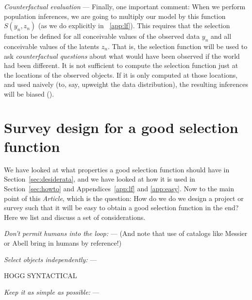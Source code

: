 \documentclass[modern]{aastex62}
\newcommand{\documentname}{\textsl{Article}}
\newcommand{\sectionname}{Section}
\newcommand{\appendixnames}{Appendices}
\renewcommand{\paragraph}[1]{\medskip\noindent\textit{#1} ---}
\begin{document}
\paragraph{Counterfactual evaluation}
Finally, one important comment: When we perform population inferences,
we are going to multiply our model by this function $S(y_n, z_n)$ (as
we do explicitly in \appendixname~\ref{app:lf}).
This requires that the selection function be defined for all
conceivable values of the observed data $y_n$ and all conceivable
values of the latents $z_n$.
That is, the selection function will be used to ask
\emph{counterfactual questions} about what would have been observed if
the world had been different.
It is not sufficient to compute the selection function just at the
locations of the observed objects.
If it is only computed at those locations, and used naively (to, say,
upweight the data distribution), the resulting inferences will be 
biased (\citealt{blogpost}).

\section{Survey design for a good selection function}\label{sec:design}

We have looked at what properties a good selection function should
have in \sectionname~\ref{sec:desiderata}, and we have looked at how
it is used in \sectionname~\ref{sec:howto} and \appendixnames~\ref{app:lf} and \ref{app:easy}.
Now to the main point of this \documentname, which is the question:
How do we do we design a project or survey such that it will be easy
to obtain a good selection function in the end?
Here we list and discuss a set of considerations.

\paragraph{Don't permit humans into the loop:}
(And note that use of catalogs like Messier or Abell bring in humans
by reference!)

\paragraph{Select objects independently:}

HOGG SYNTACTICAL

\paragraph{Keep it as simple as possible:}
\end{document}
